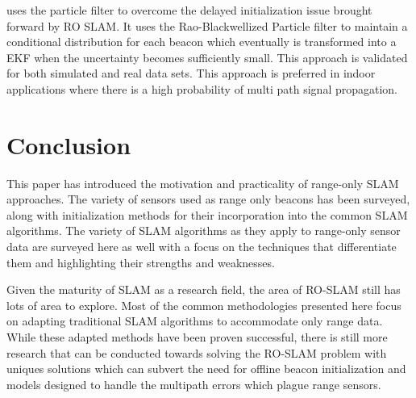 \documentclass[conference]{IEEEtran}
\begin{document}
   \cite{Blanco2008a} uses the particle filter to overcome the delayed initialization issue brought forward by RO SLAM. It uses the Rao-Blackwellized Particle filter to maintain a conditional distribution for each beacon which eventually is transformed into a EKF when the uncertainty becomes sufficiently small. This approach is validated for both simulated and real data sets. This approach is preferred in indoor applications where there is a high probability of multi path signal propagation.

	
	
	
	
	
	
	
	
	
	
	
	
	
	
	
	
	\section{Conclusion}
	\label{conclusion}
	This paper has introduced the motivation and practicality of range-only SLAM approaches. The variety of sensors used as range only beacons has been surveyed, along with initialization methods for their incorporation into the common SLAM algorithms. The variety of SLAM algorithms as they apply to range-only sensor data are surveyed here as well with a focus on the techniques that differentiate them and highlighting their strengths and weaknesses.

	Given the maturity of SLAM as a research field, the area of RO-SLAM still has lots of area to explore. Most of the common methodologies presented here focus on adapting traditional SLAM algorithms to accommodate only range data. While these adapted methods have been proven successful, there is still more research that can be conducted towards solving the RO-SLAM problem with uniques solutions which can subvert the need for offline beacon initialization and models designed to handle the multipath errors which plague range sensors.
	
	
	
	
	
	
	
	
	
	
\end{document}
